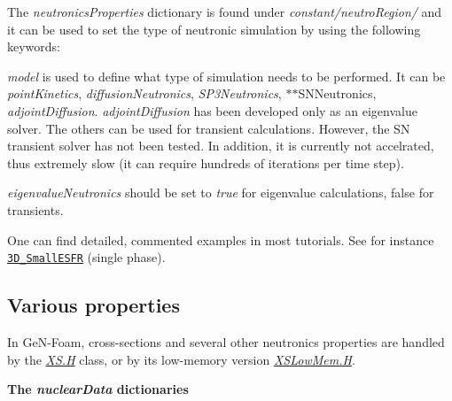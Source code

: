 The {\itshape neutronics\+Properties} dictionary is found under {\itshape constant/neutro\+Region/} and it can be used to set the type of neutronic simulation by using the following keywords\+: 
\begin{DoxyItemize}
\item {\itshape model} is used to define what type of simulation needs to be performed. It can be {\itshape point\+Kinetics}, {\itshape diffusion\+Neutronics}, {\itshape S\+P3\+Neutronics}, $\ast$$\ast$\+S\+N\+Neutronics, {\itshape adjoint\+Diffusion}. {\itshape adjoint\+Diffusion} has been developed only as an eigenvalue solver. The others can be used for transient calculations. However, the SN transient solver has not been tested. In addition, it is currently not accelrated, thus extremely slow (it can require hundreds of iterations per time step). 
\item {\itshape eigenvalue\+Neutronics} should be set to {\itshape true} for eigenvalue calculations, false for transients. 
\end{DoxyItemize}One can find detailed, commented examples in most tutorials. See for instance \href{https://gitlab.com/foam-for-nuclear/GeN-Foam/-/tree/master/Tutorials/3D_SmallESFR/rootCase/constant/neutroRegion/neutronicsProperties}{\tt 3\+D\+\_\+\+Small\+E\+S\+FR} (single phase). 

\subsection*{Various properties}

In Ge\+N-\/\+Foam, cross-\/sections and several other neutronics properties are handled by the {\itshape \hyperlink{XS_8H}{X\+S.\+H}} class, or by its low-\/memory version {\itshape \hyperlink{XSLowMem_8H}{X\+S\+Low\+Mem.\+H}}.

 {\bfseries The {\itshape nuclear\+Data} dictionaries}

